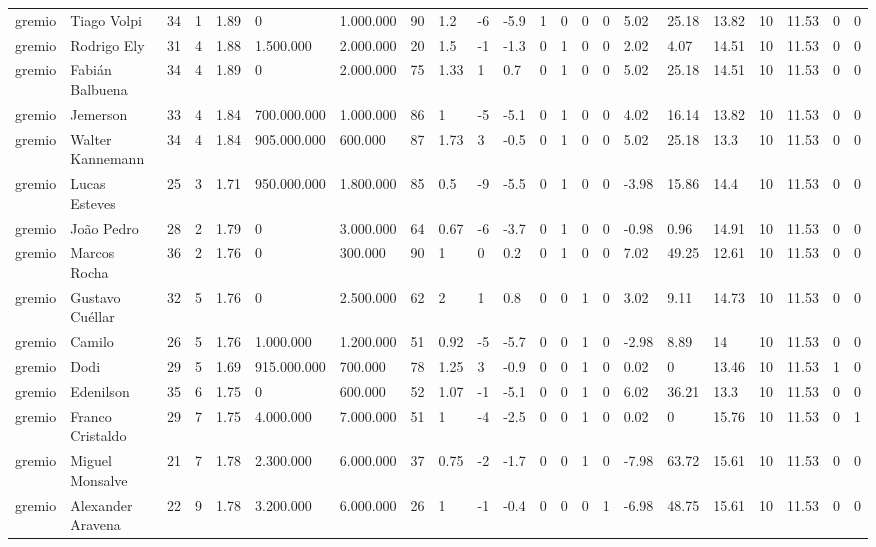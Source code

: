 \begin{longtable}{llllllllllllllllllllll}
gremio & Tiago Volpi & 34 & 1 & 1.89 & 0 & 1.000.000 & 90 & 1.2 & -6 & -5.9 & 1 & 0 & 0 & 0 & 5.02 & 25.18 & 13.82 & 10 & 11.53 & 0 & 0 \\
gremio & Rodrigo Ely & 31 & 4 & 1.88 & 1.500.000 & 2.000.000 & 20 & 1.5 & -1 & -1.3 & 0 & 1 & 0 & 0 & 2.02 & 4.07 & 14.51 & 10 & 11.53 & 0 & 0 \\
gremio & Fabián Balbuena & 34 & 4 & 1.89 & 0 & 2.000.000 & 75 & 1.33 & 1 & 0.7 & 0 & 1 & 0 & 0 & 5.02 & 25.18 & 14.51 & 10 & 11.53 & 0 & 0 \\
gremio & Jemerson & 33 & 4 & 1.84 & 700.000.000 & 1.000.000 & 86 & 1 & -5 & -5.1 & 0 & 1 & 0 & 0 & 4.02 & 16.14 & 13.82 & 10 & 11.53 & 0 & 0 \\
gremio & Walter Kannemann & 34 & 4 & 1.84 & 905.000.000 & 600.000 & 87 & 1.73 & 3 & -0.5 & 0 & 1 & 0 & 0 & 5.02 & 25.18 & 13.3 & 10 & 11.53 & 0 & 0 \\
gremio & Lucas Esteves & 25 & 3 & 1.71 & 950.000.000 & 1.800.000 & 85 & 0.5 & -9 & -5.5 & 0 & 1 & 0 & 0 & -3.98 & 15.86 & 14.4 & 10 & 11.53 & 0 & 0 \\
gremio & João Pedro & 28 & 2 & 1.79 & 0 & 3.000.000 & 64 & 0.67 & -6 & -3.7 & 0 & 1 & 0 & 0 & -0.98 & 0.96 & 14.91 & 10 & 11.53 & 0 & 0 \\
gremio & Marcos Rocha & 36 & 2 & 1.76 & 0 & 300.000 & 90 & 1 & 0 & 0.2 & 0 & 1 & 0 & 0 & 7.02 & 49.25 & 12.61 & 10 & 11.53 & 0 & 0 \\
gremio & Gustavo Cuéllar & 32 & 5 & 1.76 & 0 & 2.500.000 & 62 & 2 & 1 & 0.8 & 0 & 0 & 1 & 0 & 3.02 & 9.11 & 14.73 & 10 & 11.53 & 0 & 0 \\
gremio & Camilo & 26 & 5 & 1.76 & 1.000.000 & 1.200.000 & 51 & 0.92 & -5 & -5.7 & 0 & 0 & 1 & 0 & -2.98 & 8.89 & 14 & 10 & 11.53 & 0 & 0 \\
gremio & Dodi & 29 & 5 & 1.69 & 915.000.000 & 700.000 & 78 & 1.25 & 3 & -0.9 & 0 & 0 & 1 & 0 & 0.02 & 0 & 13.46 & 10 & 11.53 & 1 & 0 \\
gremio & Edenilson & 35 & 6 & 1.75 & 0 & 600.000 & 52 & 1.07 & -1 & -5.1 & 0 & 0 & 1 & 0 & 6.02 & 36.21 & 13.3 & 10 & 11.53 & 0 & 0 \\
gremio & Franco Cristaldo & 29 & 7 & 1.75 & 4.000.000 & 7.000.000 & 51 & 1 & -4 & -2.5 & 0 & 0 & 1 & 0 & 0.02 & 0 & 15.76 & 10 & 11.53 & 0 & 1 \\
gremio & Miguel Monsalve & 21 & 7 & 1.78 & 2.300.000 & 6.000.000 & 37 & 0.75 & -2 & -1.7 & 0 & 0 & 1 & 0 & -7.98 & 63.72 & 15.61 & 10 & 11.53 & 0 & 0 \\
gremio & Alexander Aravena & 22 & 9 & 1.78 & 3.200.000 & 6.000.000 & 26 & 1 & -1 & -0.4 & 0 & 0 & 0 & 1 & -6.98 & 48.75 & 15.61 & 10 & 11.53 & 0 & 0 \\

\end{longtable}
